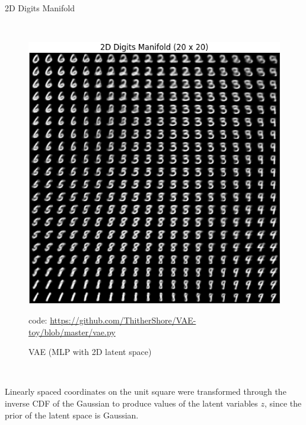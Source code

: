 \documentclass{beamer}
\begin{document}
\begin{frame}{2D Digits Manifold}
\begin{minipage}[c]{.03\textwidth}~\\\end{minipage}
\begin{minipage}[c]{.47\textwidth}
 \begin{figure}
  \includegraphics[width=\columnwidth]{fig/x_xent_latent_2_ep_20_n_57.png}
  \caption{VAE (MLP with 2D latent space)}
  \begin{center}
  \textcolor[RGB]{185 181 205}{\tiny code: \url{https://github.com/ThitherShore/VAE-toy/blob/master/vae.py}}
  \end{center}
 \end{figure}
\end{minipage}
\begin{minipage}[c]{.05\textwidth}~\\\end{minipage}
\begin{minipage}[c]{.4\textwidth}
Linearly spaced coordinates on the unit square were transformed through the inverse CDF of the Gaussian to produce values of the latent variables $z$, since the prior of the latent space is Gaussian.
\end{minipage}
\end{frame}
\end{document}
